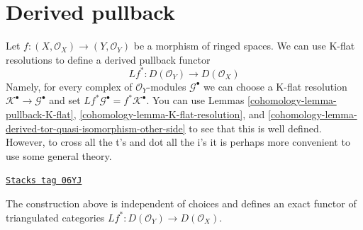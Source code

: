 \section{Derived pullback}
\label{cohomology-section-derived-pullback}
Let $f : (X, \mathcal{O}_X) \to (Y, \mathcal{O}_Y)$
be a morphism of ringed spaces. We can use K-flat resolutions to define
a derived pullback functor
$$
Lf^* : D(\mathcal{O}_Y) \to D(\mathcal{O}_X)
$$
Namely, for every complex of $\mathcal{O}_Y$-modules $\mathcal{G}^\bullet$
we can choose a K-flat resolution
$\mathcal{K}^\bullet \to \mathcal{G}^\bullet$ and set
$Lf^*\mathcal{G}^\bullet = f^*\mathcal{K}^\bullet$.
You can use
Lemmas \ref{cohomology-lemma-pullback-K-flat},
\ref{cohomology-lemma-K-flat-resolution}, and
\ref{cohomology-lemma-derived-tor-quasi-isomorphism-other-side}
to see that this is well defined. However, to cross all the t's and dot all
the i's it is perhaps more convenient to use some general theory.

\begin{lemma}
\label{cohomology-lemma-derived-base-change}
\href{https://stacks.math.columbia.edu/tag/06YJ}{\texttt{Stacks tag 06YJ}}

The construction above is independent of choices and defines an exact
functor of triangulated categories
$Lf^* : D(\mathcal{O}_Y) \to D(\mathcal{O}_X)$.
\end{lemma}

